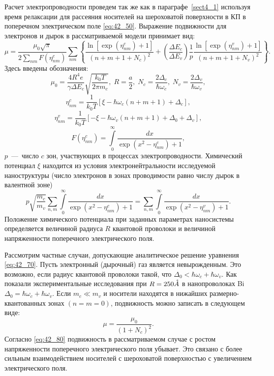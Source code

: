Расчет электропроводности проведем так же как в параграфе~\ref{sect4_1} используя время релаксации для рассеяния носителей на шероховатой поверхности в КП в поперечном электрическом поле \eqref{eq:42_50}. Выражение подвижности для электронов и дырок в рассматриваемой модели принимает вид:
\begin{equation} \label{eq:42_60}
\mu =\frac{\mu_0\sqrt{\pi } }{2\sum_{nm} F(\eta_{nm}^c )} \sum_{nm}\left\{\frac{\ln \left[\exp \left(\eta _{nm}^c \right)+1\right]}{\left(n+m+1+N_c \right)^2 } +\left(\frac{\Delta E_c }{\Delta E_v } \right)\frac{1}{p} \frac{\ln \left[\exp \left(\eta_{nm}^v \right)+1\right]}{\left(n+m+1+N_v \right)^2 } \right\} . 
\end{equation} 
Здесь введены обозначения:
\[
\mu_0 =\frac{4R^4 e}{\gamma \Delta E_c } \sqrt{\frac{k_0 T}{2\pi m_c } }, \;
R=\frac{a}{2}, \;
N_c =\frac{2\Delta_c }{\hbar \omega_c }, \;
N_v =\frac{2\Delta_v }{\hbar \omega_v },
\] 
\[
\eta_{nm}^c =\frac{1}{k_0 T} \left[\xi -\hbar \omega_c \left(n+m+1\right)+\Delta_c \right],
\] 
\[
\eta_{nm}^v =\frac{1}{k_0 T} \left[-\xi -\hbar \omega_v \left(n+m+1\right)+\Delta_0 +\Delta_v \right],
\] 
\[
F(\eta_{nm}^c )=\int\limits_0^{\infty }{\frac{dx}{\exp \left(x^2 -\eta_{nm}^c \right)+1}}  ,
\] 
$p$~---~число $c$ зон, участвующих в процессах электропроводности. Химический потенциал $\xi $ находится из условия электронейтральности исследуемой наноструктуры (число электронов в зонах проводимости равно числу дырок в валентной зоне)
\begin{equation} \label{eq:42_70}
p\sqrt{\frac{m_c }{m_v } } \sum_{n,m}\int\limits_{0}^{\infty }{\frac{dx}{\exp \left(x^2 -\eta_{nm}^c \right)+1}}  =
\sum_{n,m}\int\limits_0^{\infty}{\frac{dx}{\exp \left(x^2 -\eta_{nm}^v \right)+1}}. 
\end{equation} 
Положение химического потенциала при заданных параметрах наносистемы определяется величиной радиуса $R$ квантовой проволоки и величиной напряженности поперечного электрического поля.

Рассмотрим частные случаи, допускающие аналитическое решение уравнения \eqref{eq:42_70}. Пусть электронный (дырочный) газ является невырожденным. Это возможно, если радиус квантовой проволоки такой, что $\Delta_0 < \hbar \omega_c +\hbar \omega_v $. Как показали экспериментальные исследования \cite{Black2003a} при $R=250 \AA$ в нанопроволоках Bi $\Delta_0 =\hbar \omega_c +\hbar \omega_v $. Если $m_c \ll m_v $ и носители находятся в нижайших размерно-квантованных зонах $(n = m = 0)$, подвижность можно записать в следующем виде:
\begin{equation} \label{eq:42_80}
\mu =\frac{\mu_0}{\left(1+N_c \right)^2 } .
\end{equation}
Согласно \eqref{eq:42_80} подвижность в рассматриваемом случае с ростом напряженности поперечного электрического поля убывает. Это связано с более сильным взаимодействием носителей с шероховатой поверхностью с увеличением электрического поля.

